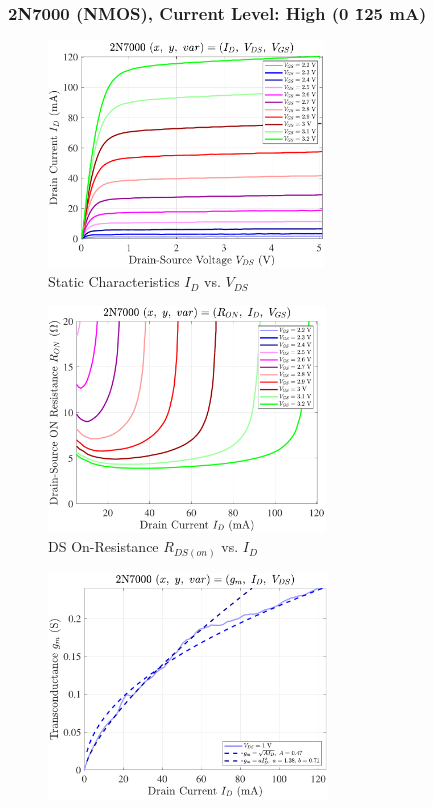 \documentclass[UTF8]{article}
\begin{document}
\newpage
\subsubsection{2N7000 (NMOS), Current Level: High (0 \~ 125 mA)}


\begin{center}
    \noindent\begin{minipage}{0.45\columnwidth}
        \begin{figure}[H]\centering
            \includegraphics[height=170pt]{LCE-04-场效应管/assets/2N7000/2N7000 (NMOS) [onsemi, KH32] current level high/2025-04-24_00-52-18__stc_Id_Vds_Vgs.pdf}
            \caption{Static Characteristics $I_D$ vs. $V_{DS}$}
        \end{figure}
        \begin{figure}[H]\centering
            \includegraphics[height=170pt]{LCE-04-场效应管/assets/2N7000/2N7000 (NMOS) [onsemi, KH32] current level high/2025-04-24_00-52-28__stc_Ron_Id_Vgs.pdf}
            \caption{DS On-Resistance $R_{DS(on)}$ vs. $I_D$}
        \end{figure}
        \begin{figure}[H]\centering
            \includegraphics[height=170pt]{LCE-04-场效应管/assets/2N7000/2N7000 (NMOS) [onsemi, KH32] current level high/2025-04-24_00-52-33__stc_gm_Id_Vds.pdf}

\end{figure}
\end{minipage}
\end{center}
\end{document}
